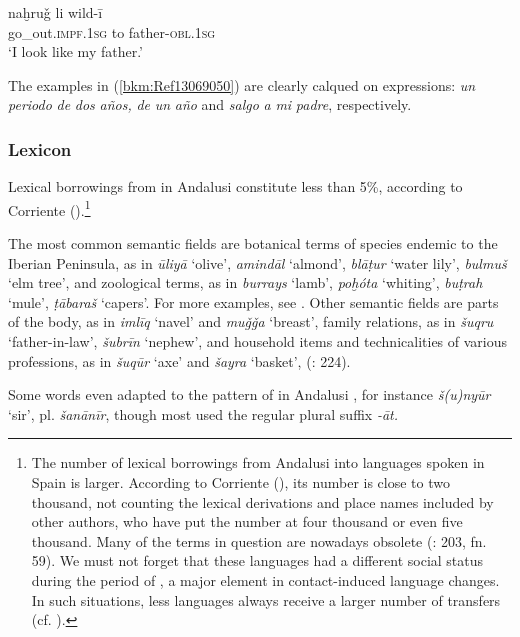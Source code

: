 \documentclass[output=paper,modfonts,nonflat]{langsci/langscibook}
\begin{document}
\ex
\gll naḫruǧ li wild-ī\\
  go\_out.\textsc{impf.1sg} to father-\textsc{obl.1sg}\\
\glt ‘I look like my father.’
\z
\z

The examples in (\ref{bkm:Ref13069050}) are clearly calqued on  expressions: \textit{un} \textit{periodo} \textit{de} \textit{dos} \textit{años,} \textit{de} \textit{un} \textit{año} and \textit{salgo} \textit{a} \textit{mi} \textit{padre}, respectively. 
 
\subsubsection{Lexicon}




Lexical borrowings from  in Andalusi  constitute less than 5\%, according to Corriente (\citeyear[142]{Corriente1992book}).\footnote{The number of lexical borrowings from Andalusi  into  languages spoken in Spain is larger. According to Corriente (\citeyear{Corriente2005}), its number is close to two thousand, not counting the lexical derivations and place names included by other authors, who have put the number at four thousand or even five thousand. Many of the terms in question are nowadays obsolete (\citealt{Corriente2005}: 203, fn. 59). We must not forget that these languages had a different social status during the period of , a major element in contact-induced language changes. In such situations, less  languages always receive a larger number of transfers (cf.  \citealt{CorrientePereiraVicente2019}).} 

The most common semantic fields are botanical terms of species endemic to the Iberian Peninsula, as in \textit{ūliyā} ‘olive’, \textit{amindāl} ‘almond’, \textit{blāṭur} ‘water lily’, \textit{bulmuš} ‘elm tree’, and zoological terms, as in \textit{burrays} ‘lamb’, \textit{poḫóta} ‘whiting’, \textit{buṭrah} ‘mule’, \textit{ṭābaraš} ‘capers’. For more examples, see \citet{CorrientePereiraVicente2017}. Other semantic fields are parts of the body, as in \textit{imlīq}  ‘navel’ and \textit{muǧǧa} ‘breast’, family relations, as in \textit{šuqru} ‘father-in-law’, \textit{šubrīn} ‘nephew’, and household items and technicalities of various professions, as in \textit{šuqūr} ‘axe’ and \textit{šayra} ‘basket’, (\citealt{CorrientePereiraVicente2015}: 224). 

Some words even adapted to the pattern of  in Andalusi , for instance \textit{š(u)nyūr} ‘sir’, pl. \textit{šanānīr}, though most used the regular plural suffix \textit{-āt.}
\end{document}
